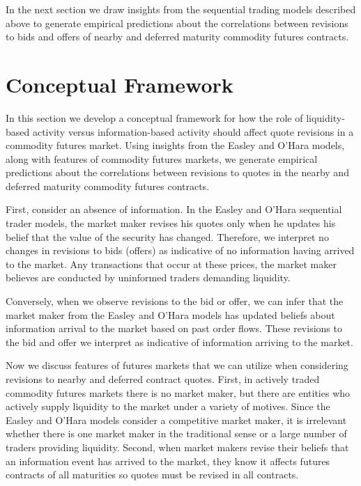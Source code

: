 \documentclass[review,12pt]{elsarticle}
\begin{document}
In the next section we draw insights from the sequential trading models
described above to generate empirical predictions about the correlations
between revisions to bids and offers of nearby and deferred maturity
commodity futures contracts.

\section{Conceptual Framework}\label{conceptual-framework}

In this section we develop a conceptual framework for how the role of
liquidity-based activity versus information-based activity should affect
quote revisions in a commodity futures market. Using insights from the
Easley and O'Hara models, along with features of commodity futures
markets, we generate empirical predictions about the correlations
between revisions to quotes in the nearby and deferred maturity
commodity futures contracts.

First, consider an absence of information. In the Easley and O'Hara
sequential trader models, the market maker revises his quotes only when
he updates his belief that the value of the security has changed.
Therefore, we interpret no changes in revisions to bids (offers) as
indicative of no information having arrived to the market. Any
transactions that occur at these prices, the market maker believes are
conducted by uninformed traders demanding liquidity.

Conversely, when we observe revisions to the bid or offer, we can infer
that the market maker from the Easley and O'Hara models has updated
beliefs about information arrival to the market based on past order
flows. These revisions to the bid and offer we interpret as indicative
of information arriving to the market.

Now we discuss features of futures markets that we can utilize when
considering revisions to nearby and deferred contract quotes. First, in
actively traded commodity futures markets there is no market maker, but
there are entities who actively supply liquidity to the market under a
variety of motives. Since the Easley and O'Hara models consider a
competitive market maker, it is irrelevant whether there is one market
maker in the traditional sense or a large number of traders providing
liquidity. Second, when market makers revise their beliefs that an
information event has arrived to the market, they know it affects
futures contracts of all maturities so quotes must be revised in all
contracts.
\end{document}
